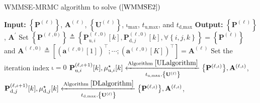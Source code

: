 \documentclass[10pt,journal]{IEEEtran}
\newcommand{\paren}[1]{\left({#1}\right)}
\newcommand{\bracket}[1]{{\left [{#1}\right ]}}
\newcommand{\braces}[1]{{\left\{ {#1}\right\}}}
\theoremstyle{definition}
\begin{document}
		\begin{algorithm}[ht!]
			\par\noindent\small
			\caption{WMMSE-MRMC algorithm to solve $\paren{\ref{WMMSE2}}$}
			\label{convexalgorithm}
			\begin{algorithmic}[1]
				\Statex \textbf{Input:} $\braces{\mathbf{P}^{\paren{\mathrm{\ell}}}}$, $\mathbf{A}^{\paren{\mathrm{\ell}}}$, $\braces{\mathbf{U}^{\paren{\mathrm{\ell}}}}$, $\mathrm{\iota}_{\textrm{max}}$, $t_{\textrm{u,max}}$, and $t_{\textrm{d,max}}$
				\Statex \textbf{Output: } $\braces{\mathbf{P}^{\paren{\ell}}}$, $\mathbf{A}^{\prime}$
				\State Set $\braces{\mathbf{P}^{\paren{\mathrm{\ell,0}}}}\triangleq\braces{\mathbf{P}^{\paren{\mathrm{\ell,0}}}_{\textrm{u},i}\bracket{k},\mathbf{P}^{\paren{\mathrm{\ell,0}}}_{\textrm{d},j}\bracket{k}, \forall \braces{i,j,k}}=\braces{\mathbf{P}^{\paren{\mathrm{\ell}}}}
				$ and $\mathbf{A}^{\paren{\mathrm{\ell,0}}}\triangleq\bracket{\paren{\mathbf{a}^{\paren{\mathrm{\ell,0}}}\bracket{1}}^\top;\cdots;\paren{\mathbf{a}^{\paren{\mathrm{\ell,0}}}\bracket{\mathrm{\mathit{K}}}}^\top}=\mathbf{A}^{\paren{\mathrm{\ell}}}$
				\State Set the iteration index $\mathrm{\iota}=0$ 
				\Repeat
				\label{stepk} %
				\State $\mathbf{P}^{\paren{\mathrm{\ell,\iota+1}}}_{\textrm{u},i}\bracket{k},\mu^\star_{\textrm{u},i}\bracket{k}\xleftarrow[t_{\textrm{u,max}},\braces{\mathbf{U}^{\paren{\mathrm{\ell}}}}]{\textrm{Algorithm }\ref{ULalgorithm}}\braces{\mathbf{P}^{\paren{\mathrm{\ell,\iota}}}},\mathbf{A}^{\paren{\mathrm{\ell,\iota}}}$, %
				\EndFor
				\State %
				$\mathbf{P}^{\paren{\mathrm{\ell,\iota+1}}}_{\textrm{d},j}\bracket{k},\mu^\star_{\textrm{d},j}\bracket{k}\xleftarrow[t_{\textrm{d,max}},\braces{\mathbf{U}^{\paren{\mathrm{\ell}}}}]{\textrm{Algorithm }\ref{DLalgorithm}}\braces{\mathbf{P}^{\paren{\mathrm{\ell,\iota}}}},\mathbf{A}^{\paren{\mathrm{\ell,\iota}}}$, %

\end{algorithmic}
\end{algorithm}
\end{document}
